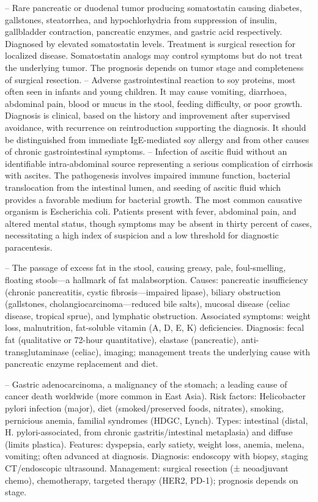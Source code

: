 -- Rare pancreatic or duodenal tumor producing somatostatin causing diabetes, gallstones, steatorrhea, and hypochlorhydria from suppression of insulin, gallbladder contraction, pancreatic enzymes, and gastric acid respectively. Diagnosed by elevated somatostatin levels. Treatment is surgical resection for localized disease. Somatostatin analogs may control symptoms but do not treat the underlying tumor. The prognosis depends on tumor stage and completeness of surgical resection.
-- Adverse gastrointestinal reaction to soy proteins, most often seen in infants and young children. It may cause vomiting, diarrhoea, abdominal pain, blood or mucus in the stool, feeding difficulty, or poor growth. Diagnosis is clinical, based on the history and improvement after supervised avoidance, with recurrence on reintroduction supporting the diagnosis. It should be distinguished from immediate IgE-mediated soy allergy and from other causes of chronic gastrointestinal symptoms.
-- Infection of ascitic fluid without an identifiable intra-abdominal source representing a serious complication of cirrhosis with ascites. The pathogenesis involves impaired immune function, bacterial translocation from the intestinal lumen, and seeding of ascitic fluid which provides a favorable medium for bacterial growth. The most common causative organism is Escherichia coli. Patients present with fever, abdominal pain, and altered mental status, though symptoms may be absent in thirty percent of cases, necessitating a high index of suspicion and a low threshold for diagnostic paracentesis.

-- The passage of excess fat in the stool, causing greasy, pale, foul-smelling, floating stools—a hallmark of fat malabsorption. Causes: pancreatic insufficiency (chronic pancreatitis, cystic fibrosis—impaired lipase), biliary obstruction (gallstones, cholangiocarcinoma—reduced bile salts), mucosal disease (celiac disease, tropical sprue), and lymphatic obstruction. Associated symptoms: weight loss, malnutrition, fat-soluble vitamin (A, D, E, K) deficiencies. Diagnosis: fecal fat (qualitative or 72-hour quantitative), elastase (pancreatic), anti-transglutaminase (celiac), imaging; management treats the underlying cause with pancreatic enzyme replacement and diet.

-- Gastric adenocarcinoma, a malignancy of the stomach; a leading cause of cancer death worldwide (more common in East Asia). Risk factors: Helicobacter pylori infection (major), diet (smoked/preserved foods, nitrates), smoking, pernicious anemia, familial syndromes (HDGC, Lynch). Types: intestinal (distal, H. pylori-associated, from chronic gastritis/intestinal metaplasia) and diffuse (limits plastica). Features: dyspepsia, early satiety, weight loss, anemia, melena, vomiting; often advanced at diagnosis. Diagnosis: endoscopy with biopsy, staging CT/endoscopic ultrasound. Management: surgical resection (± neoadjuvant chemo), chemotherapy, targeted therapy (HER2, PD-1); prognosis depends on stage.

